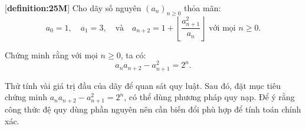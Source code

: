 \documentclass[../03-arithmetic-functions.tex]{subfiles}
\begin{document}
\begin{exercise*}\label{example:GBR-2015-TST-F2-P5}[\textbf{definition:25M}]
    Cho dãy số nguyên $(a_n)_{n \ge 0}$ thỏa mãn:
    \[
        a_0 = 1, \quad a_1 = 3, \quad \text{và} \quad a_{n+2} = 1 + \left\lfloor \frac{a_{n+1}^2}{a_n} \right\rfloor \text{ với mọi } n \ge 0.
    \]
    
    Chứng minh rằng với mọi \(n \ge 0\), ta có:
    \[
        a_n a_{n+2} - a_{n+1}^2 = 2^n.
    \]
\end{exercise*}

\begin{remark*}
    Thử tính vài giá trị đầu của dãy để quan sát quy luật. Sau đó, đặt mục tiêu chứng minh \( a_n a_{n+2} - a_{n+1}^2 = 2^n \), có thể dùng phương pháp quy nạp. Để ý rằng công thức đệ quy dùng phần nguyên nên cần biến đổi phù hợp để tính toán chính xác.
\end{remark*}

\end{document}
